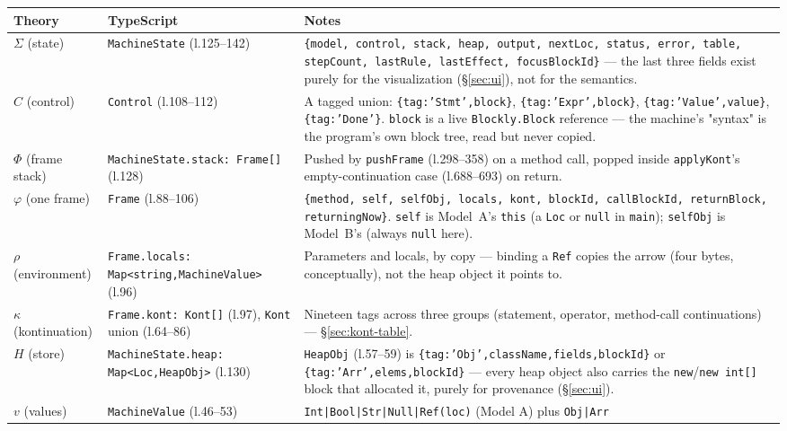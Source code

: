 \documentclass[11pt]{article}
\begin{document}
\begin{center}
\begin{longtable}{@{}p{2.6cm}p{4.6cm}p{7.0cm}@{}}
\toprule
\textbf{Theory} & \textbf{TypeScript} & \textbf{Notes} \\
\midrule
\endhead
$\Sigma$ (state) &
  \texttt{MachineState} (l.125--142) &
  \texttt{\{model, control, stack, heap, output, nextLoc, status, error,
  table, stepCount, lastRule, lastEffect, focusBlockId\}} --- the last
  three fields exist purely for the visualization (\S\ref{sec:ui}), not for
  the semantics. \\
$C$ (control) &
  \texttt{Control} (l.108--112) &
  A tagged union: \texttt{\{tag:'Stmt',block\}}, \texttt{\{tag:'Expr',block\}},
  \texttt{\{tag:'Value',value\}}, \texttt{\{tag:'Done'\}}. \texttt{block} is
  a live \texttt{Blockly.Block} reference --- the machine's "syntax" is the
  program's own block tree, read but never copied. \\
$\Phi$ (frame stack) &
  \texttt{MachineState.stack: Frame[]} (l.128) &
  Pushed by \texttt{pushFrame} (l.298--358) on a method call, popped inside
  \texttt{applyKont}'s empty-continuation case (l.688--693) on return. \\
$\varphi$ (one frame) &
  \texttt{Frame} (l.88--106) &
  \texttt{\{method, self, selfObj, locals, kont, blockId, callBlockId,
  returnBlock, returningNow\}}. \texttt{self} is Model~A's \texttt{this}
  (a \texttt{Loc} or \texttt{null} in \texttt{main}); \texttt{selfObj} is
  Model~B's (always \texttt{null} here). \\
$\rho$ (environment) &
  \texttt{Frame.locals: Map<string,MachineValue>} (l.96) &
  Parameters and locals, by copy --- binding a \texttt{Ref} copies the
  arrow (four bytes, conceptually), not the heap object it points to. \\
$\kappa$ (kontinuation) &
  \texttt{Frame.kont: Kont[]} (l.97), \texttt{Kont} union (l.64--86) &
  Nineteen tags across three groups (statement, operator, method-call
  continuations) --- \S\ref{sec:kont-table}. \\
$H$ (store) &
  \texttt{MachineState.heap: Map<Loc,HeapObj>} (l.130) &
  \texttt{HeapObj} (l.57--59) is \texttt{\{tag:'Obj',className,fields,blockId\}}
  or \texttt{\{tag:'Arr',elems,blockId\}} --- every heap object also carries
  the \texttt{new}/\texttt{new int[]} block that allocated it, purely for
  provenance (\S\ref{sec:ui}). \\
$v$ (values) &
  \texttt{MachineValue} (l.46--53) &
  \texttt{Int|Bool|Str|Null|Ref(loc)} (Model A) plus \texttt{Obj|Arr}

\end{longtable}
\end{center}
\end{document}
